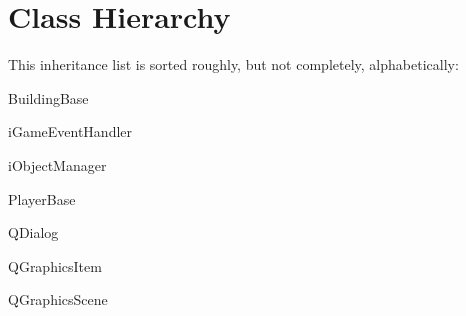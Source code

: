 \section{Class Hierarchy}
This inheritance list is sorted roughly, but not completely, alphabetically\-:\begin{DoxyCompactList}
\item Building\-Base\begin{DoxyCompactList}
\item {}
\item {}
\end{DoxyCompactList}
\item i\-Game\-Event\-Handler\begin{DoxyCompactList}
\item {}
\end{DoxyCompactList}
\item i\-Object\-Manager\begin{DoxyCompactList}
\item {}
\end{DoxyCompactList}
\item Player\-Base\begin{DoxyCompactList}
\item {}
\end{DoxyCompactList}
\item Q\-Dialog\begin{DoxyCompactList}
\item {}
\item {}
\end{DoxyCompactList}
\item Q\-Graphics\-Item\begin{DoxyCompactList}
\item {}
\end{DoxyCompactList}
\item Q\-Graphics\-Scene\begin{DoxyCompactList}
\item {}
\end{DoxyCompactList}

\end{DoxyCompactList}
